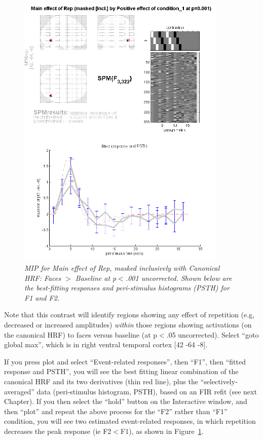 \begin{figure}
\begin{center}
\includegraphics[width=100mm]{faces/cat3_psth}
\caption{\em MIP for Main effect of Rep, masked inclusively with Canonical HRF: Faces  $>$ Baseline at p$<$.001 uncorrected. Shown below are the best-fitting responses and peri-stimulus histograms (PSTH) for F1 and F2. \label{cat3_psth} } 
\end{center}
\end{figure}

Note that this contrast will identify regions showing any effect of repetition (e.g, decreased or increased amplitudes) \emph{within} those regions showing activations (on the canonical HRF) to faces versus baseline (at p$<$.05 uncorrected). Select ``goto global max'', which is in right ventral temporal cortex [42 -64 -8].

If you press plot and select ``Event-related responses'', then ``F1'', then ``fitted response and PSTH'', you will see the best fitting linear combination of the canonical HRF and its two derivatives (thin red line), plus the ``selectively-averaged'' data (peri-stimulus histogram, PSTH), based on an FIR refit (see next Chapter). 
If you then select the ``hold'' button on the Interactive window, and then ``plot'' and repeat the above process for the ``F2'' rather than ``F1'' condition, you will see two estimated event-related responses, in which repetition decreases the peak response (ie F2$<$F1), as shown in Figure~\ref{cat3_psth}.

